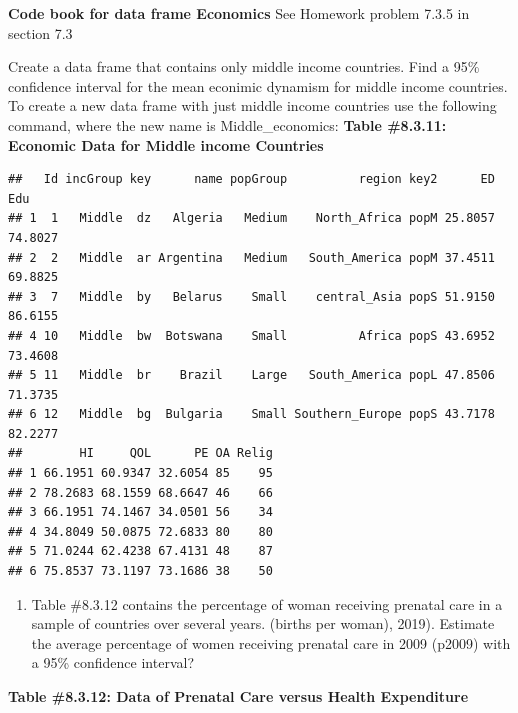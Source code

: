 \documentclass[
]{book}
\newenvironment{Shaded}{\begin{snugshade}}{\end{snugshade}}
\newcommand{\KeywordTok}[1]{\textcolor[rgb]{0.13,0.29,0.53}{\textbf{#1}}}
\newcommand{\NormalTok}[1]{#1}
\newcommand{\OperatorTok}[1]{\textcolor[rgb]{0.81,0.36,0.00}{\textbf{#1}}}
\newcommand{\StringTok}[1]{\textcolor[rgb]{0.31,0.60,0.02}{#1}}
\providecommand{\tightlist}{%
  \setlength{\itemsep}{0pt}\setlength{\parskip}{0pt}}
\begin{document}
\textbf{Code book for data frame Economics} See Homework problem 7.3.5 in section 7.3

Create a data frame that contains only middle income countries. Find a 95\% confidence interval for the mean econimic dynamism for middle income countries. To create a new data frame with just middle income countries use the following command, where the new name is Middle\_economics:
\textbf{Table \#8.3.11: Economic Data for Middle income Countries}

\begin{Shaded}
\end{Shaded}

\begin{verbatim}
##   Id incGroup key      name popGroup          region key2      ED     Edu
## 1  1   Middle  dz   Algeria   Medium    North_Africa popM 25.8057 74.8027
## 2  2   Middle  ar Argentina   Medium   South_America popM 37.4511 69.8825
## 3  7   Middle  by   Belarus    Small    central_Asia popS 51.9150 86.6155
## 4 10   Middle  bw  Botswana    Small          Africa popS 43.6952 73.4608
## 5 11   Middle  br    Brazil    Large   South_America popL 47.8506 71.3735
## 6 12   Middle  bg  Bulgaria    Small Southern_Europe popS 43.7178 82.2277
##        HI     QOL      PE OA Relig
## 1 66.1951 60.9347 32.6054 85    95
## 2 78.2683 68.1559 68.6647 46    66
## 3 66.1951 74.1467 34.0501 56    34
## 4 34.8049 50.0875 72.6833 80    80
## 5 71.0244 62.4238 67.4131 48    87
## 6 75.8537 73.1197 73.1686 38    50
\end{verbatim}

\begin{enumerate}
\def\labelenumi{\arabic{enumi}.}
\setcounter{enumi}{5}
\tightlist
\item
  Table \#8.3.12 contains the percentage of woman receiving prenatal care in a sample of countries over several years. (births per woman), 2019). Estimate the average percentage of women receiving prenatal care in 2009 (p2009) with a 95\% confidence interval?
\end{enumerate}

\textbf{Table \#8.3.12: Data of Prenatal Care versus Health Expenditure}
\end{document}
